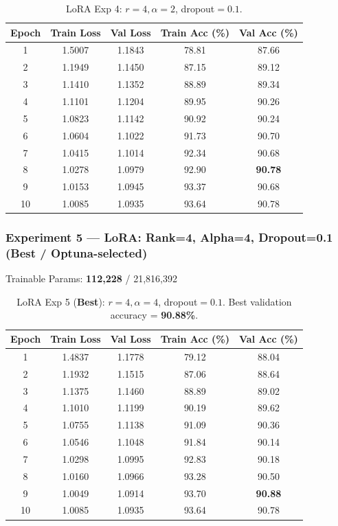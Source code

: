 \documentclass[11pt,a4paper]{article}
\begin{document}
\begin{table}[H]
\centering
\begin{tabular}{@{}ccccc@{}}
\toprule
\textbf{Epoch} & \textbf{Train Loss} & \textbf{Val Loss} & \textbf{Train Acc (\%)} & \textbf{Val Acc (\%)} \\
\midrule
1  & 1.5007 & 1.1843 & 78.81 & 87.66 \\
2  & 1.1949 & 1.1450 & 87.15 & 89.12 \\
3  & 1.1410 & 1.1352 & 88.89 & 89.34 \\
4  & 1.1101 & 1.1204 & 89.95 & 90.26 \\
5  & 1.0823 & 1.1142 & 90.92 & 90.24 \\
6  & 1.0604 & 1.1022 & 91.73 & 90.70 \\
7  & 1.0415 & 1.1014 & 92.34 & 90.68 \\
8  & 1.0278 & 1.0979 & 92.90 & \textbf{90.78} \\
9  & 1.0153 & 1.0945 & 93.37 & 90.68 \\
10 & 1.0085 & 1.0935 & 93.64 & 90.78 \\
\bottomrule
\end{tabular}
\caption{LoRA Exp 4: $r=4, \alpha=2$, dropout$=0.1$.}
\end{table}

\subsubsection*{Experiment 5 — LoRA: Rank=4, Alpha=4, Dropout=0.1 \textnormal{(\textbf{Best / Optuna-selected})}}
\begin{center}
\small Trainable Params: \textbf{112,228} / 21,816,392
\end{center}

\begin{table}[H]
\centering
\begin{tabular}{@{}ccccc@{}}
\toprule
\textbf{Epoch} & \textbf{Train Loss} & \textbf{Val Loss} & \textbf{Train Acc (\%)} & \textbf{Val Acc (\%)} \\
\midrule
1  & 1.4837 & 1.1778 & 79.12 & 88.04 \\
2  & 1.1932 & 1.1515 & 87.06 & 88.64 \\
3  & 1.1375 & 1.1460 & 88.89 & 89.02 \\
4  & 1.1010 & 1.1199 & 90.19 & 89.62 \\
5  & 1.0755 & 1.1138 & 91.09 & 90.36 \\
6  & 1.0546 & 1.1048 & 91.84 & 90.14 \\
7  & 1.0298 & 1.0995 & 92.83 & 90.18 \\
8  & 1.0160 & 1.0966 & 93.28 & 90.50 \\
9  & 1.0049 & 1.0914 & 93.70 & \textbf{90.88} \\
10 & 1.0085 & 1.0935 & 93.64 & 90.78 \\
\bottomrule
\end{tabular}
\caption{LoRA Exp 5 (\textbf{Best}): $r=4, \alpha=4$, dropout$=0.1$. Best validation accuracy = \textbf{90.88\%}.}
\end{table}
\end{document}
